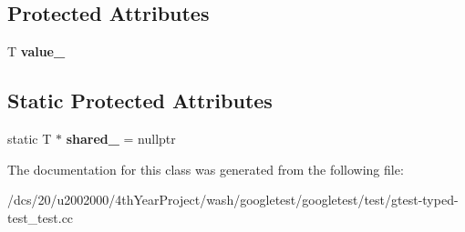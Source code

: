 \subsection*{Protected Attributes}
\begin{DoxyCompactItemize}
\item 
\mbox{\label{classCommonTest_ae59c4abcb833625a7baeb2048531ebec}} 
T {\bfseries value\+\_\+}
\end{DoxyCompactItemize}
\subsection*{Static Protected Attributes}
\begin{DoxyCompactItemize}
\item 
\mbox{\label{classCommonTest_a52368ce1e65a865db9bdccbcc2cedaac}} 
static T $\ast$ {\bfseries shared\+\_\+} = nullptr
\end{DoxyCompactItemize}


The documentation for this class was generated from the following file\+:\begin{DoxyCompactItemize}
\item 
/dcs/20/u2002000/4th\+Year\+Project/wash/googletest/googletest/test/gtest-\/typed-\/test\+\_\+test.\+cc\end{DoxyCompactItemize}
